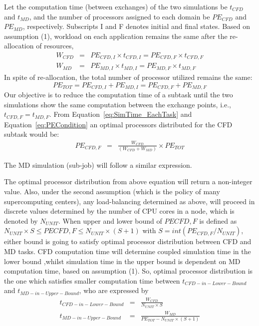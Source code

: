 \documentclass[conference,final]{IEEEtran}
\newcommand{\jhanote}[1]{ {\textcolor{red} { ***Jha: #1 }}}
\newcommand{\jhanote}[1]{}
\begin{document}
Let the computation time (between exchanges) of the two simulations
be $t_{CFD}$ and $t_{MD}$, and the number of processors assigned to
each domain be $PE_{CFD}$ and $PE_{MD}$, respectively. Subscripts I and F denotes initial and final states. Based on
assumption (1), workload on each application remains the same after
the re-allocation of resources, 
\begin{eqnarray}
W_{CFD} &=& PE_{CFD,I} \times t_{CFD,I} = PE_{CFD,F} \times t_{CFD,F} \nonumber \\
W_{MD} &=& PE_{MD,I} \times t_{MD,I} = PE_{MD,F} \times t_{MD,F}
\label{eq:SimTime_EachTask}
\end{eqnarray}
In spite
of re-allocation, the total number of processor utilized remains the
same:
\begin{equation}
PE_{TOT} = PE_{CFD,I} + PE_{MD,I} = PE_{CFD,F} + PE_{MD,F}
\label{eq:PECondition}
\end{equation}
Our objective is to reduce the computation time of a subtask until the
two simulations show the same computation between the exchange points, i.e., $t_{CFD,F} = t_{MD,F}$. From
Equation~\ref{eq:SimTime_EachTask} and Equation~\ref{eq:PECondition}
an optimal processors distributed for the CFD subtask would be:
\begin{eqnarray}
PE_{CFD,F} & = & \frac {W_{CFD}} {(W_{CFD} + W_{MD})} \times PE_{TOT}
\end{eqnarray}

The MD simulation (sub-job) will follow a similar expression. 

The optimal processor distribution from above equation will return a
non-integer value. Also, under the second assumption (which is the
policy of many supercomputing centers), any load-balancing determined
as above, will proceed in discrete values determined by the number of CPU cores in a node, which is denoted by $N_{UNIT}$. When upper and lower bound of $PE{CFD,F}$ is defined as 
$
N_{UNIT} \times S \le PE{CFD,F} \le N_{UNIT} \times (S+1)
$
with $S = int(PE_{CFD,F} / N_{UNIT})$, either bound is going to satisfy optimal processor distribution between CFD and MD tasks. CFD computation time will determine coupled simulation time in the lower bound ,whilst simulation time in the upper bound is dependent on MD computation time, based on assumption (1). So, optimal processor distribution is the one which satisfies smaller computation time between $t_{CFD-in-Lower-Bound}$ and $t_{MD-in-Upper-Bound}$, who are expressed by
\begin{eqnarray}
t_{CFD-in-Lower-Bound} & = & \frac {W_{CFD}} {N_{UNIT} \times S}
\nonumber \\
t_{MD-in-Upper-Bound} & = & \frac {W_{MD}} {PE_{TOT}-N_{UNIT} \times (S+1)}
\label{eq:Optimal_Time_Condition}
\end{eqnarray}
\end{document}
